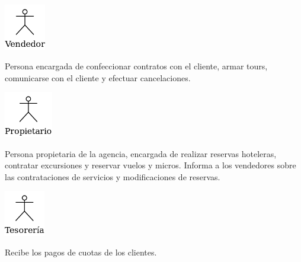\documentclass[12pt,a4paper,titlepage,oneside]{article}
\begin{document}
\vspace*{1.5cm}

\begin{minipage}[b]{0.2\linewidth}\centering
	\includegraphics[height=2cm]{actor_vendedor}
\end{minipage}
\begin{minipage}[b]{0.8\linewidth}\centering
	\begin{flushleft}
	Persona encargada de confeccionar contratos con el cliente, armar tours, comunicarse con el cliente y efectuar cancelaciones. \\
	\end{flushleft}
\end{minipage}

\vspace*{1.5cm}


\begin{minipage}[b]{0.2\linewidth}\centering
	\includegraphics[height=2cm]{actor_propietario}
\end{minipage}
\begin{minipage}[b]{0.8\linewidth}\centering
	\begin{flushleft}
	Persona propietaria de la agencia, encargada de realizar reservas hoteleras, contratar excursiones y reservar vuelos y micros. Informa a los vendedores sobre las contrataciones de servicios y modificaciones de reservas. \\
	\end{flushleft}
\end{minipage}


\vspace*{1.5cm}


\begin{minipage}[b]{0.2\linewidth}\centering
	\includegraphics[height=2cm]{actor_tesoreria}
\end{minipage}
\begin{minipage}[b]{0.8\linewidth}\centering
	\begin{flushleft}
	Recibe los pagos de cuotas de los clientes. \\
	\end{flushleft}
\end{minipage}
\end{document}
